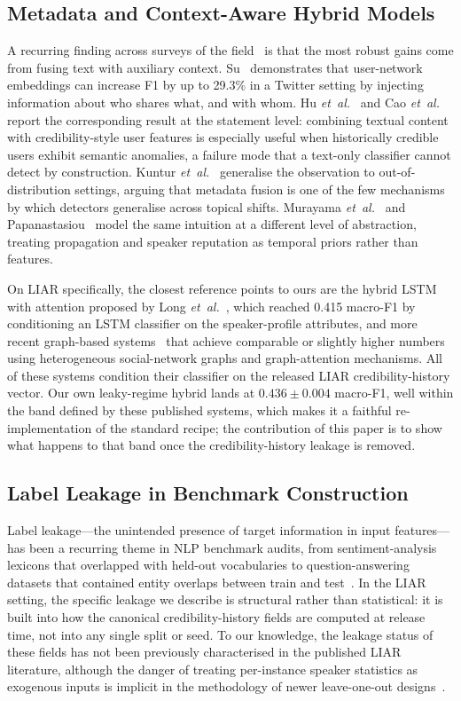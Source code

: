 \documentclass[journal]{IEEEtran}
\begin{document}
\subsection{Metadata and Context-Aware Hybrid Models}
A recurring finding across surveys of the field~\cite{shu2017,oshikawa2020,mahara2022,villela2023} is that the most robust gains come from fusing text with auxiliary context. Su~\cite{su2022} demonstrates that user-network embeddings can increase F1 by up to 29.3\% in a Twitter setting by injecting information about who shares what, and with whom. Hu \emph{et~al.}~\cite{hu2025} and Cao \emph{et~al.}~\cite{cao2025capsule} report the corresponding result at the statement level: combining textual content with credibility-style user features is especially useful when historically credible users exhibit semantic anomalies, a failure mode that a text-only classifier cannot detect by construction. Kuntur \emph{et~al.}~\cite{kuntur2024} generalise the observation to out-of-distribution settings, arguing that metadata fusion is one of the few mechanisms by which detectors generalise across topical shifts. Murayama \emph{et~al.}~\cite{murayama2021} and Papanastasiou~\cite{papanastasiou2020} model the same intuition at a different level of abstraction, treating propagation and speaker reputation as temporal priors rather than features.

On LIAR specifically, the closest reference points to ours are the hybrid LSTM with attention proposed by Long \emph{et~al.}~\cite{long2017fakenews}, which reached 0.415 macro-F1 by conditioning an LSTM classifier on the speaker-profile attributes, and more recent graph-based systems~\cite{zhang2024heterosgt,gu2024,tong2025,zhang2024phd} that achieve comparable or slightly higher numbers using heterogeneous social-network graphs and graph-attention mechanisms. All of these systems condition their classifier on the released LIAR credibility-history vector. Our own leaky-regime hybrid lands at $0.436 \pm 0.004$ macro-F1, well within the band defined by these published systems, which makes it a faithful re-implementation of the standard recipe; the contribution of this paper is to show what happens to that band once the credibility-history leakage is removed.

\subsection{Label Leakage in Benchmark Construction}
Label leakage---the unintended presence of target information in input features---has been a recurring theme in NLP benchmark audits, from sentiment-analysis lexicons that overlapped with held-out vocabularies to question-answering datasets that contained entity overlaps between train and test~\cite{oshikawa2020}. In the LIAR setting, the specific leakage we describe is structural rather than statistical: it is built into how the canonical credibility-history fields are computed at release time, not into any single split or seed. To our knowledge, the leakage status of these fields has not been previously characterised in the published LIAR literature, although the danger of treating per-instance speaker statistics as exogenous inputs is implicit in the methodology of newer leave-one-out designs~\cite{kuntur2024}.
\end{document}
